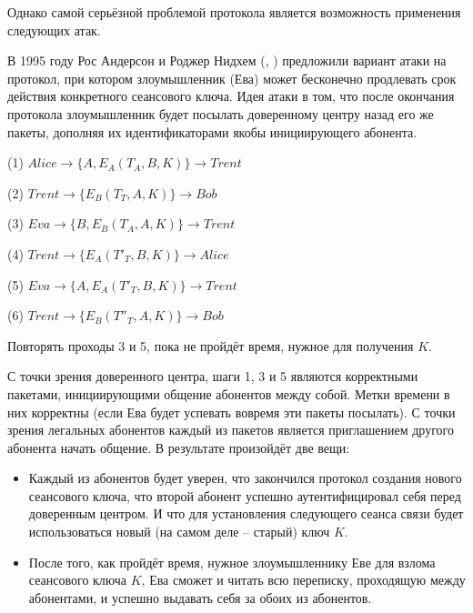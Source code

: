 Однако самой серьёзной проблемой протокола является возможность применения следующих атак.

В 1995 году Рос Андерсон и Роджер Нидхем (, \cite{Anderson:Needham:1995}) предложили вариант атаки на протокол, при котором злоумышленник (Ева) может бесконечно продлевать срок действия конкретного сеансового ключа. Идея атаки в том, что после окончания протокола злоумышленник будет посылать доверенному центру назад его же пакеты, дополняя их идентификаторами якобы инициирующего абонента.

\begin{protocol}
	\item[(1)] $Alice \to \{ A, E_A \left( T_A, B, K \right) \} \to Trent$
	\item[(2)] $Trent \to \{ E_B \left( T_T, A, K \right) \} \to Bob$
	\item[(3)] $Eva \to \{ B, E_B \left( T_A, A, K \right) \} \to Trent$
	\item[(4)] $Trent \to \{ E_A \left( T'_T, B, K \right) \} \to Alice$
	\item[(5)] $Eva \to \{ A, E_A \left( T'_T, B, K \right) \} \to Trent$
	\item[(6)] $Trent \to \{ E_B \left( T''_T, A, K \right) \} \to Bob$
	\item[{}] Повторять проходы 3 и 5, пока не пройдёт время, нужное для получения $K$.
\end{protocol}

С точки зрения доверенного центра, шаги 1, 3 и 5 являются корректными пакетами, инициирующими общение абонентов между собой. Метки времени в них корректны (если Ева будет успевать вовремя эти пакеты посылать). С точки зрения легальных абонентов каждый из пакетов является приглашением другого абонента начать общение. В результате произойдёт две вещи:

\begin{itemize}
	\item Каждый из абонентов будет уверен, что закончился протокол создания нового сеансового ключа, что второй абонент успешно аутентифицировал себя перед доверенным центром. И что для установления следующего сеанса связи будет использоваться новый (на самом деле -- старый) ключ $K$.
	\item После того, как пройдёт время, нужное злоумышленнику Еве для взлома сеансового ключа $K$, Ева сможет и читать всю переписку, проходящую между абонентами, и успешно выдавать себя за обоих из абонентов.
\end{itemize}

